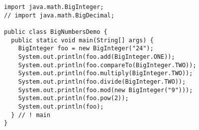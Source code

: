 \documentclass[en, 11pt, xcolor=dvipsnames]{beamer}
\begin{document}
\begin{frame}[fragile]


	\begin{columns}[c]
		\begin{column}{0.9\textwidth}

			\begin{lstlisting}[style=Java]
import java.math.BigInteger;
// import java.math.BigDecimal;

public class BigNumbersDemo {
  public static void main(String[] args) {
    BigInteger foo = new BigInteger("24");
    System.out.println(foo.add(BigInteger.ONE));
    System.out.println(foo.compareTo(BigInteger.TWO));
    System.out.println(foo.multiply(BigInteger.TWO));
    System.out.println(foo.divide(BigInteger.TWO));
    System.out.println(foo.mod(new BigInteger("9")));
    System.out.println(foo.pow(2));
    System.out.println(foo);
  } // ! main
}\end{lstlisting}


		\end{column}
	\end{columns}

\end{frame}
\end{document}
